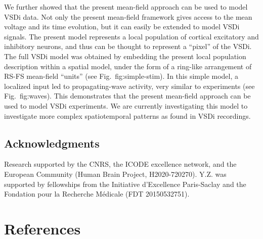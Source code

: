 \documentclass[8pt, colorlinks, a4paper]{article}
\renewcommand\ref{}
\begin{document}
We further showed that the present mean-field approach can be used to
model VSDi data.  Not only the present mean-field framework gives
access to the mean voltage and its time evolution, but it can easily
be extended to model VSDi signals.  The present model represents a
local population of cortical excitatory and inhibitory neurons, and
thus can be thought to represent a ``pixel'' of the VSDi.  The full
VSDi model was obtained by embedding the present local population
description within a spatial model, under the form of a ring-like
arrangement of RS-FS mean-field ``units'' (see
Fig.~\ref{fig:simple-stim}).  In this simple model, a localized input
led to propagating-wave activity, very similar to experiments (see
Fig.~\ref{fig:waves}).  This demonstrates that the present mean-field
approach can be used to model VSDi experiments.  We are currently
investigating this model to investigate more complex spatiotemporal
patterns as found in VSDi recordings.

\subsection*{Acknowledgments} 

Research supported by the CNRS, the ICODE excellence network, and the
European Community (Human Brain Project, H2020-720270).  Y.Z. was
supported by fellowships from the Initiative d'Excellence Paris-Saclay
and the Fondation pour la Recherche M\'edicale (FDT 20150532751).

\section{References}
\label{sec-6}
\small


\end{document}
